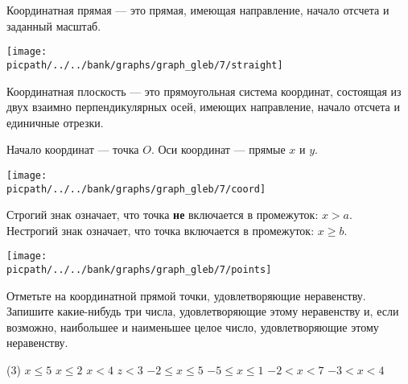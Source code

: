 
\begin{class}[number=1]
	\begin{definit}
	Координатная прямая --- это прямая, имеющая направление, начало отсчета и заданный масштаб.
	\end{definit}
	\begin{minipage}[c]{0.9\linewidth}
		\texttt{[image: \\picpath/../../bank/graphs/graph\_gleb/7/straight]}
	\end{minipage}
	\begin{definit}
		Координатная плоскость --- это прямоугольная система координат, состоящая из двух взаимно перпендикулярных осей, имеющих направление, начало отсчета и единичные отрезки.
	\end{definit}
	\begin{definit}
		Начало координат --- точка \(O\).
		Оси координат --- прямые \(x\) и \(y\).
	\end{definit}
	\begin{minipage}[c]{0.9\linewidth}
		\texttt{[image: \\picpath/../../bank/graphs/graph\_gleb/7/coord]}
	\end{minipage}
	\begin{minipage}[c]{0.6\linewidth}
		\begin{definit}
			Строгий знак означает, что точка \textbf{не} включается в промежуток: \(x>a\). \\
			Нестрогий знак означает, что точка включается в промежуток: \(x\ge b\).
		\end{definit}
	\end{minipage}
	\begin{minipage}[c]{0.4\linewidth}
		\texttt{[image: \\picpath/../../bank/graphs/graph\_gleb/7/points]}
	\end{minipage}
	\begin{listofex}
		\item Отметьте на координатной прямой точки, удовлетворяющие неравенству. Запишите какие-нибудь три числа, удовлетворяющие этому неравенству и, если возможно, наибольшее и наименьшее целое число, удовлетворяющие этому неравенству.
		\begin{tasks}(3)
			\task \( x \le 5 \)
			\task \( x \le 2 \)
			\task \( x < 4 \)
			\task \( z<3 \)
			\task \( -2 \le x \le 5 \)
			\task \( -5 \le x \le 1 \)
			\task \( -2 < x < 7 \)
			\task \( -3 < x < 4 \)
		\end{tasks}

\end{listofex}
\end{class}
